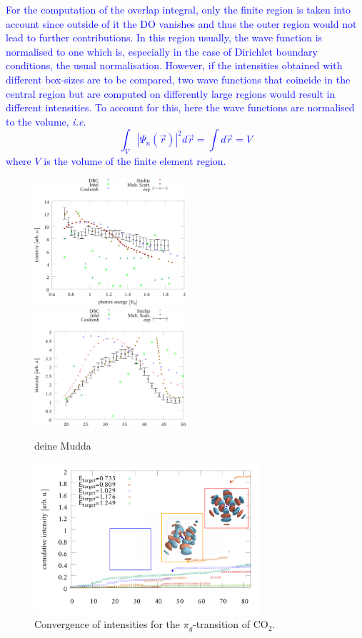 \textcolor{blue}{
For the computation of the overlap integral, only the finite region is taken into account since outside of it the DO vanishes and thus the outer region would not lead to further contributions.
In this region usually, the wave function is normalised to one which is, especially in the case of Dirichlet boundary conditions, the usual normalisation.
However, if the intensities obtained with different box-sizes are to be compared, two wave functions that coincide in the central region but are computed on differently large regions would result in different intensities.
To account for this, here the wave functions are normalised to the volume, \textit{i.e.}
\begin{equation}
\int_V \left|\Psi_n (\vec{r})\right|^2d\vec{r}=\int d\vec{r}=V
\end{equation}
where $V$ is the volume of the finite element region.}

\begin{figure}
\includegraphics[width=0.5\textwidth]{Figures/CO2/pi_gCS.pdf}
\includegraphics[width=0.5\textwidth]{Figures/CO2/sigma_g.pdf}
\caption{deine Mudda}
\label{fig:sigmagCS}
\end{figure}

\begin{figure}
\includegraphics[width=0.75\textwidth]{Figures/CO2/Cronverge}
\caption{Convergence of intensities for the $\pi_g$-transition of CO$_2$.}
\label{cronverge}
\end{figure}

